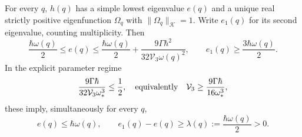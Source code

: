 \begin{lemma}
\label{fq:gap}
For every $q$, $h(q)$ has a simple lowest eigenvalue $e(q)$ and a
unique real strictly positive eigenfunction $\Omega_q$ with
$\|\Omega_q\|_{\mathscr K}=1$. Write $e_1(q)$ for its second
eigenvalue, counting multiplicity. Then
\begin{equation}\label{fq:energy-bounds}
 \frac{\hbar\omega(q)}2\leq e(q)
 \leq\frac{\hbar\omega(q)}2
       +\frac{9\Gamma\hbar^2}{32\mathcal V_3\omega(q)^2},
 \qquad e_1(q)\geq\frac{3\hbar\omega(q)}2.
\end{equation}
In the explicit parameter regime
\begin{equation}\label{fq:regime}
 \frac{9\Gamma\hbar}{32\mathcal V_3\omega_*^3}\leq\frac12,
 \quad\hbox{equivalently}\quad
 \mathcal V_3\geq\frac{9\Gamma\hbar}{16\omega_*^3},
\end{equation}
these imply, simultaneously for every $q$,
\begin{equation}\label{fq:separation}
 e(q)\leq\hbar\omega(q),\qquad
 e_1(q)-e(q)\geq\lambda(q):=\frac{\hbar\omega(q)}2>0.
\end{equation}
\end{lemma}
